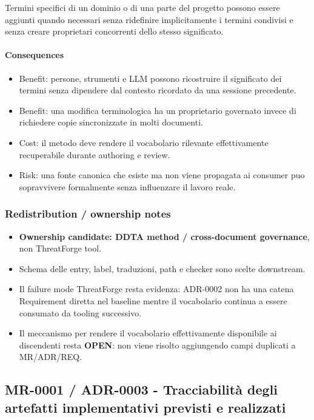 \documentclass[
  10pt,
]{article}
\providecommand{\tightlist}{%
  \setlength{\itemsep}{0pt}\setlength{\parskip}{0pt}}
\begin{document}
Termini specifici di un dominio o di una parte del progetto possono
essere aggiunti quando necessari senza ridefinire implicitamente i
termini condivisi e senza creare proprietari concorrenti dello stesso
significato.

\paragraph{Consequences}\label{consequences-3}

\begin{itemize}
\tightlist
\item
  Benefit: persone, strumenti e LLM possono ricostruire il significato
  dei termini senza dipendere dal contesto ricordato da una sessione
  precedente.
\item
  Benefit: una modifica terminologica ha un proprietario governato
  invece di richiedere copie sincronizzate in molti documenti.
\item
  Cost: il metodo deve rendere il vocabolario rilevante effettivamente
  recuperabile durante authoring e review.
\item
  Risk: una fonte canonica che esiste ma non viene propagata ai consumer
  puo sopravvivere formalmente senza influenzare il lavoro reale.
\end{itemize}

\subsubsection{Redistribution / ownership
notes}\label{redistribution-ownership-notes-1}

\begin{itemize}
\tightlist
\item
  \textbf{Ownership candidate: DDTA method / cross-document governance},
  non ThreatForge tool.
\item
  Schema delle entry, label, traduzioni, path e checker sono scelte
  downstream.
\item
  Il failure mode ThreatForge resta evidenza: ADR-0002 non ha una catena
  Requirement diretta nel baseline mentre il vocabolario continua a
  essere consumato da tooling successivo.
\item
  Il meccanismo per rendere il vocabolario effettivamente disponibile ai
  discendenti resta \textbf{OPEN}: non viene risolto aggiungendo campi
  duplicati a MR/ADR/REQ.
\end{itemize}

\subsection{MR-0001 / ADR-0003 - Tracciabilità degli artefatti
implementativi previsti e
realizzati}\label{mr-0001-adr-0003---tracciabilituxe0-degli-artefatti-implementativi-previsti-e-realizzati}
\end{document}

